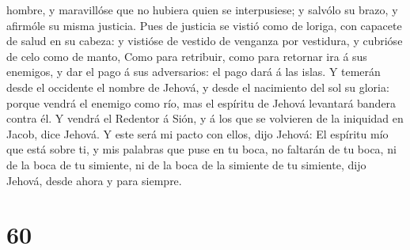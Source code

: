 hombre, y maravillóse que no hubiera quien se interpusiese; y salvólo su
brazo, y afirmóle su misma justicia.  Pues de justicia se
vistió como de loriga, con capacete de salud en su cabeza: y vistióse de
vestido de venganza por vestidura, y cubrióse de celo como de manto,
 Como para retribuir, como para retornar ira á sus
enemigos, y dar el pago á sus adversarios: el pago dará á las islas.
 Y temerán desde el occidente el nombre de Jehová, y desde
el nacimiento del sol su gloria: porque vendrá el enemigo como río, mas
el espíritu de Jehová levantará bandera contra él.  Y
vendrá el Redentor á Sión, y á los que se volvieren de la iniquidad en
Jacob, dice Jehová.  Y este será mi pacto con ellos, dijo
Jehová: El espíritu mío que está sobre ti, y mis palabras que puse en tu
boca, no faltarán de tu boca, ni de la boca de tu simiente, ni de la
boca de la simiente de tu simiente, dijo Jehová, desde ahora y para
siempre.

\hypertarget{section-59}{%
\section{60}\label{section-59}}


